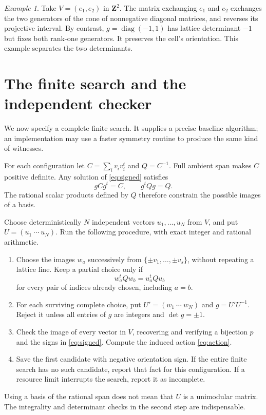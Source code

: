 \documentclass[11pt,a4paper]{article}
\numberwithin{equation}{section}
\theoremstyle{definition}
\theoremstyle{remark}
\newtheorem{example}[proposition]{Example}
\newcommand{\Z}{\mathbf Z}
\begin{document}
\begin{example}\label{ex:orientation}
Take \(V=(e_1,e_2)\) in \(\Z^2\). The matrix exchanging \(e_1\) and
\(e_2\) exchanges the two generators of the cone of nonnegative
diagonal matrices, and reverses its projective interval.
By contrast, \(g=\operatorname{diag}(-1,1)\) has lattice determinant
\(-1\) but fixes both rank-one generators. It preserves the cell's
orientation. This example separates the two determinants.
\end{example}

\section{The finite search and the independent checker}\label{sec:algorithm}

We now specify a complete finite search. It supplies a precise
baseline algorithm; an implementation may use a faster symmetry
routine to produce the same kind of witnesses.

For each configuration let \(C=\sum_i v_i v_i^t\) and \(Q=C^{-1}\).
Full ambient span makes \(C\) positive definite.
Any solution of \eqref{eq:signed} satisfies
\begin{equation}\label{eq:isometry}
 gCg^t=C,\qquad g^tQg=Q.
\end{equation}
The rational scalar products defined by \(Q\) therefore constrain
the possible images of a basis.

Choose deterministically \(N\) independent vectors
\(u_1,\ldots,u_N\) from \(V\), and put \(U=(u_1\ \cdots\ u_N)\).
Run the following procedure, with exact integer and rational arithmetic.
\begin{enumerate}
\item Choose the images \(w_a\) successively from
      \(\{\pm v_1,\ldots,\pm v_s\}\), without repeating a lattice line.
      Keep a partial choice only if
      \[
       w_a^tQw_b=u_a^tQu_b
      \]
      for every pair of indices already chosen, including \(a=b\).
\item For each surviving complete choice, put
      \(U'=(w_1\ \cdots\ w_N)\) and \(g=U'U^{-1}\).
      Reject it unless all entries of \(g\) are integers and
      \(\det g=\pm1\).
\item Check the image of every vector in \(V\), recovering and
      verifying a bijection \(p\) and the signs in \eqref{eq:signed}.
      Compute the induced action \eqref{eq:action}.
\item Save the first candidate with negative orientation sign.
      If the entire finite search has no such candidate, report that
      fact for this configuration. If a resource limit interrupts
      the search, report it as incomplete.
\end{enumerate}
Using a basis of the rational span does not mean that \(U\) is a
unimodular matrix. The integrality and determinant checks in the
second step are indispensable.
\end{document}
